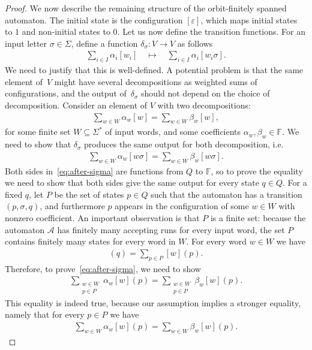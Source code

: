 \documentclass{theoretics}
\newcommand{\Aa}{{\mathcal A}}
\newcommand{\field}{\mathbb F}
\begin{document}
\begin{proof}
    We now describe the remaining structure of the orbit-finitely spanned automaton.
     The initial state is the configuration $[\varepsilon]$, which maps initial states to $1$ and non-initial states to $0$. Let us now define the transition functions. 
    For an input letter $\sigma \in \Sigma$, define a function $\delta_\sigma : V \to V$ as follows
    \begin{align*}
     \sum_{i \in I} \alpha_i [w_i]\quad \mapsto \quad  \sum_{i \in I} \alpha_i [w_i \sigma].
    \end{align*}
    We need to justify that this is well-defined. A potential problem  is that the same element of~$V$ might have several decompositions as weighted sums of configurations, and  the  output of~$\delta_\sigma$ should not depend on the choice of decomposition.  
     Consider an element of $V$ with two decompositions: 
        \begin{align*}
            \sum_{w \in W} \alpha_w [w] = 
            \sum_{w \in W} \beta_w [w],
        \end{align*}
        for some finite set $W \subseteq \Sigma^*$ of input words, and some coefficients $\alpha_w,\beta_w\in\field$. 
        We need to show that $\delta_\sigma$ produces the same output for both decomposition, i.e.
        \begin{align}\label{eq:after-sigma}
            \sum_{w \in W} \alpha_w [w \sigma] = 
            \sum_{w \in W} \beta_w [w \sigma].
        \end{align}
        Both sides in~\eqref{eq:after-sigma} are functions from $Q$ to $\field$, so to prove the equality we need to show that both sides give the same output for every state $q\in Q$. For a fixed $q$, let $P$ be the set of states $p \in Q$ such that the automaton has a transition $(p,\sigma,q)$, and furthermore $p$ appears in the configuration of some $w \in W$ with nonzero coefficient.  An important observation is that $P$ is a finite set: because the automaton $\Aa$ has finitely many accepting runs for every input word, the set $P$ contains finitely many states for every word in $W$. For every word $w \in W$ we have 
\begin{align*}
[w\sigma](q) = \sum_{p \in P} [w](p).
\end{align*}
Therefore, to prove~\eqref{eq:after-sigma}, we need to show 
\begin{align*}
    \sum_{\substack{w \in W\\ p \in P}}  \alpha_w [w](p) = 
    \sum_{\substack{w \in W\\ p \in P}}  \beta_w [w](p).
\end{align*}
This equality is indeed true, because our assumption implies a stronger equality, namely that for every $p \in P$ we have 
\begin{align*}
    \sum_{ w \in W}  \alpha_w [w](p) = 
    \sum_{w \in W}  \beta_w [w](p).
\end{align*}



\end{proof}
\end{document}
